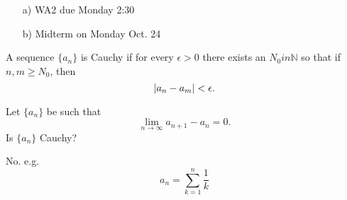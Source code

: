 
\begin{enumerate}
    \item[a)] WA2 due Monday 2:30
    \item[b)] Midterm on Monday Oct. 24
\end{enumerate}

\begin{defn}
A sequence $\{a_n\}$ is Cauchy if for every $\epsilon > 0$ there exists an $N_0 in \mathbb{N}$ so that if $n,m\geq N_0$, then \[\left| a_n-a_m \right|<\epsilon.\]
\end{defn}

\begin{ques}
Let $\{a_n\}$ be such that \[\lim_{n\to\infty}a_{n+1}-a_n = 0.\] Is $\{a_n\}$ Cauchy?
\end{ques}

\begin{solution}
No. e.g. \[a_n = \sum_{k=1}^n \frac{1}{k}\]
\end{solution}